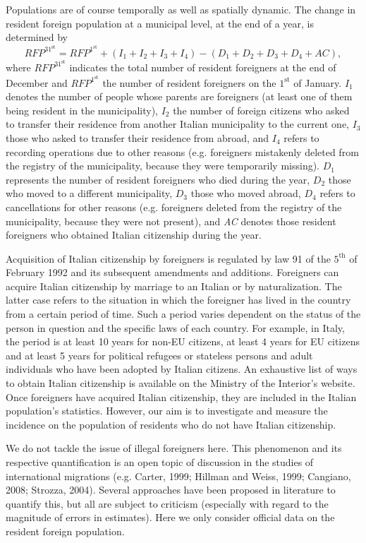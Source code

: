 Populations are of course temporally as well as spatially dynamic. The change in resident foreign population at a municipal level, at the end of a year, is determined by
$$
RFP^{31^\text{st}} = RFP^{1^\text{st}} + (I_1 + I_2 + I_3+ I_4) - (D_1 + D_2 + D_3 + D_4 + AC),
$$ 
where $RFP^{31^\text{st}}$ indicates the total number of resident foreigners at the end of December and $RFP^{1^\text{st}}$ the number of resident foreigners on the $1^\text{st}$ of January. $I_{1}$ denotes the number of people whose parents are foreigners (at least one of them being resident in the municipality), $I_{2}$ the number of foreign citizens who asked to transfer their residence from another Italian municipality to the current one, $I_{3}$ those who asked to transfer their residence from abroad, and $I_{4}$ refers to recording operations due to other reasons (e.g. foreigners mistakenly deleted from the registry of the municipality, because they were temporarily missing). $D_{1}$ represents the number of resident foreigners who died during the year, $D_{2}$ those who moved to a different municipality, $D_{3}$ those who moved abroad, $D_{4}$ refers to cancellations for other reasons (e.g. foreigners deleted from the registry of the municipality, because they were not present), and \textit{AC} denotes those resident foreigners who obtained Italian citizenship during the year. 

Acquisition of Italian citizenship by foreigners is regulated by law 91 of the $5^\text{th}$ of February 1992 and its subsequent amendments and additions. Foreigners can acquire Italian citizenship by marriage to an Italian or by naturalization. The latter case refers to the situation in which the foreigner has lived in the country from a certain period of time. Such a period varies dependent on the status of the person in question and the specific laws of each country. For example, in Italy, the period is at least 10 years for non-EU citizens, at least 4 years for EU citizens and at least 5 years for political refugees or stateless persons and adult individuals who have been adopted by Italian citizens. An exhaustive list of ways to obtain Italian citizenship is available on the Ministry of the Interior's website. Once foreigners have acquired Italian citizenship, they are included in the Italian population's statistics. However, our aim is to investigate and measure the incidence on the population of  residents who do not have Italian citizenship.

We do not tackle the issue of illegal foreigners here. This phenomenon and its respective quantification is an open topic of discussion in the studies of international migrations (e.g. Carter, 1999; Hillman and Weiss, 1999; Cangiano, 2008; Strozza, 2004). Several approaches have been proposed in literature to quantify this, but all are subject to criticism (especially with regard to the magnitude of errors in estimates). Here we only consider official data on the resident foreign population. 

